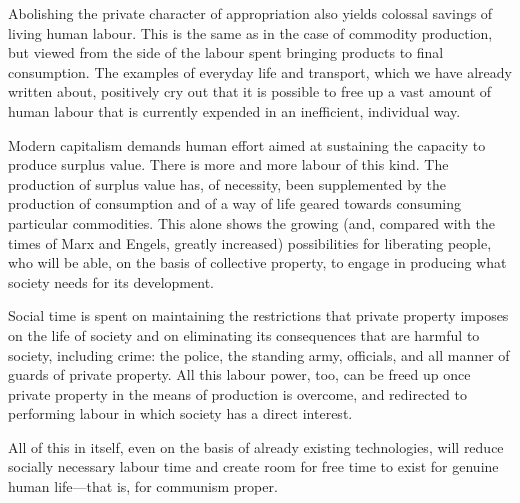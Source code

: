 \documentclass[12pt,a4paper,openany]{book}
\begin{document}
Abolishing the private character of appropriation also yields colossal savings of living human labour. This is the same as in the case of commodity production, but viewed from the side of the labour spent bringing products to final consumption. The examples of everyday life and transport, which we have already written about, positively cry out that it is possible to free up a vast amount of human labour that is currently expended in an inefficient, individual way.

Modern capitalism demands human effort aimed at sustaining the capacity to produce surplus value. There is more and more labour of this kind. The production of surplus value has, of necessity, been supplemented by the production of consumption and of a way of life geared towards consuming particular commodities. This alone shows the growing (and, compared with the times of Marx and Engels, greatly increased) possibilities for liberating people, who will be able, on the basis of collective property, to engage in producing what society needs for its development.

Social time is spent on maintaining the restrictions that private property imposes on the life of society and on eliminating its consequences that are harmful to society, including crime: the police, the standing army, officials, and all manner of guards of private property. All this labour power, too, can be freed up once private property in the means of production is overcome, and redirected to performing labour in which society has a direct interest.

All of this in itself, even on the basis of already existing technologies, will reduce socially necessary labour time and create room for free time to exist for genuine human life—that is, for communism proper.
\end{document}
